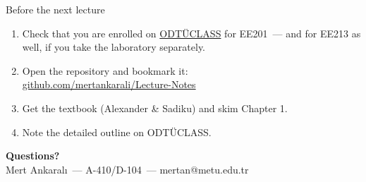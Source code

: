 \documentclass[11pt,aspectratio=169]{beamer}
\makeatletter
\newcommand{\coursecode}{EE201}
\newcommand{\myname}{Mert Ankaralı}
\newcommand{\myoffice}{A-410/D-104}
\newcommand{\mymail}{mertan@metu.edu.tr}
\newcommand{\notesrepo}{https://github.com/mertankarali/Lecture-Notes/tree/master/METU-EE201}
\newcommand{\notesrepotext}{github.com/mertankarali/Lecture-Notes}
\newcommand{\odtuclass}{https://odtuclass.metu.edu.tr}
\makeatother
\begin{document}
\begin{frame}{Before the next lecture}
  \begin{enumerate}
    \item Check that you are enrolled on \href{\odtuclass}{ODTÜCLASS} for \coursecode\
          --- and for EE213 as well, if you take the laboratory separately.
    \item Open the repository and bookmark it:\\[2pt]
          \hspace*{1.2em}\ttfamily \href{\notesrepo}{\notesrepotext}
    \item Get the textbook (Alexander \& Sadiku) and skim Chapter 1.
    \item Note the detailed outline on ODTÜCLASS.
  \end{enumerate}
  \vfill
  \begin{center}
    \Large\color{metured}\textbf{Questions?}\\[4pt]
    \normalsize\color{metugray} \myname\ --- \myoffice\ --- \mymail
  \end{center}
\end{frame}
\end{document}

